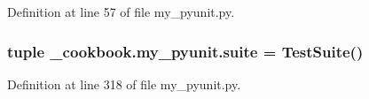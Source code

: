 Definition at line 57 of file my\-\_\-pyunit.\-py.

\hypertarget{namespace__cookbook_1_1my__pyunit_a0d863c11cc0e82383e086450f052ecea}{
\subsubsection[{suite}]{\setlength{\rightskip}{0pt plus 5cm}tuple \-\_\-cookbook.\-my\-\_\-pyunit.\-suite = {\bf Test\-Suite}()}}\label{namespace__cookbook_1_1my__pyunit_a0d863c11cc0e82383e086450f052ecea}


Definition at line 318 of file my\-\_\-pyunit.\-py.

